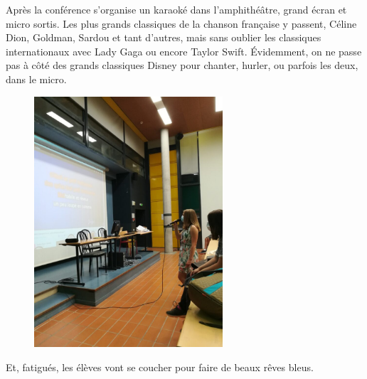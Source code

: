 Après la conférence s’organise un karaoké dans l’amphithéâtre, grand écran et micro sortis. Les plus grands classiques de la chanson française y passent, Céline Dion, Goldman, Sardou et tant d’autres, mais sans oublier les classiques internationaux avec Lady Gaga ou encore Taylor Swift. Évidemment, on ne passe pas à côté des grands classiques Disney pour chanter, hurler, ou parfois les deux, dans le micro.

\begin{figure}[H]
\centering\includegraphics[width=7cm]{CR-18-7.jpg}
\end{figure}

Et, fatigués, les élèves vont se coucher pour faire de beaux rêves bleus.

